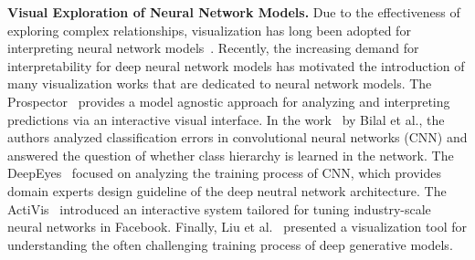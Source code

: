\textbf{Visual Exploration of Neural Network Models.}
Due to the effectiveness of exploring complex relationships, visualization has long been adopted for interpreting neural network models~\cite{TzengMa2005}.
Recently, the increasing demand for interpretability for deep neural network models has motivated the introduction of many visualization works that are dedicated to neural network models.
The Prospector~\cite{KrausePererNg2016} provides a model agnostic approach for analyzing and interpreting predictions via an interactive visual interface.
%
In the work~\cite{BilalJourablooYe2018} by Bilal et al., the authors analyzed classification errors in convolutional neural networks (CNN) and answered the question of whether class hierarchy is learned in the network.
%
The DeepEyes~\cite{Pezzotti2018} focused on analyzing the training process of CNN, which provides domain experts design guideline of the deep neutral network architecture.
%
The ActiVis~\cite{KahngAndrewsKalro2018} introduced an interactive system tailored for tuning industry-scale neural networks in Facebook.
Finally, Liu et al.~\cite{LiuShiCao2018} presented a visualization tool for understanding the often challenging training process of deep generative models.


